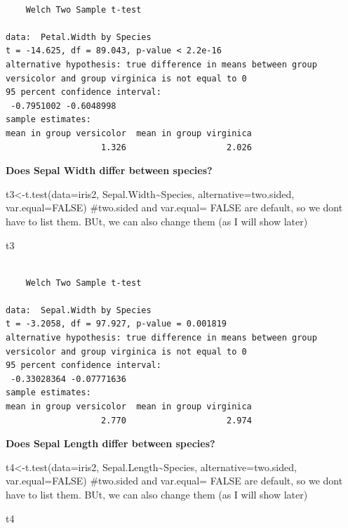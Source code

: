 \documentclass[
  letterpaper,
  DIV=11,
  numbers=noendperiod]{scrartcl}
\newenvironment{Shaded}{\begin{snugshade}}{\end{snugshade}}
\newcommand{\AttributeTok}[1]{\textcolor[rgb]{0.40,0.45,0.13}{#1}}
\newcommand{\CommentTok}[1]{\textcolor[rgb]{0.37,0.37,0.37}{#1}}
\newcommand{\ConstantTok}[1]{\textcolor[rgb]{0.56,0.35,0.01}{#1}}
\newcommand{\FunctionTok}[1]{\textcolor[rgb]{0.28,0.35,0.67}{#1}}
\newcommand{\NormalTok}[1]{\textcolor[rgb]{0.00,0.23,0.31}{#1}}
\newcommand{\OtherTok}[1]{\textcolor[rgb]{0.00,0.23,0.31}{#1}}
\newcommand{\SpecialCharTok}[1]{\textcolor[rgb]{0.37,0.37,0.37}{#1}}
\newcommand{\StringTok}[1]{\textcolor[rgb]{0.13,0.47,0.30}{#1}}
\begin{document}
\begin{verbatim}

    Welch Two Sample t-test

data:  Petal.Width by Species
t = -14.625, df = 89.043, p-value < 2.2e-16
alternative hypothesis: true difference in means between group versicolor and group virginica is not equal to 0
95 percent confidence interval:
 -0.7951002 -0.6048998
sample estimates:
mean in group versicolor  mean in group virginica 
                   1.326                    2.026 
\end{verbatim}

\hfill\break
\textbf{Does Sepal Width differ between species?}

\begin{Shaded}
\begin{Highlighting}[]
\NormalTok{t3}\OtherTok{\textless{}{-}}\FunctionTok{t.test}\NormalTok{(}\AttributeTok{data=}\NormalTok{iris2, Sepal.Width}\SpecialCharTok{\textasciitilde{}}\NormalTok{Species, }\AttributeTok{alternative=}\StringTok{\textquotesingle{}two.sided\textquotesingle{}}\NormalTok{, }\AttributeTok{var.equal=}\ConstantTok{FALSE}\NormalTok{) }\CommentTok{\#two.sided and var.equal= FALSE are default, so we don\textquotesingle{}t have to list them. BUt, we can also change them (as I will show later)}

\NormalTok{t3}
\end{Highlighting}
\end{Shaded}

\begin{verbatim}

    Welch Two Sample t-test

data:  Sepal.Width by Species
t = -3.2058, df = 97.927, p-value = 0.001819
alternative hypothesis: true difference in means between group versicolor and group virginica is not equal to 0
95 percent confidence interval:
 -0.33028364 -0.07771636
sample estimates:
mean in group versicolor  mean in group virginica 
                   2.770                    2.974 
\end{verbatim}

\hfill\break
\textbf{Does Sepal Length differ between species?}

\begin{Shaded}
\begin{Highlighting}[]
\NormalTok{t4}\OtherTok{\textless{}{-}}\FunctionTok{t.test}\NormalTok{(}\AttributeTok{data=}\NormalTok{iris2, Sepal.Length}\SpecialCharTok{\textasciitilde{}}\NormalTok{Species, }\AttributeTok{alternative=}\StringTok{\textquotesingle{}two.sided\textquotesingle{}}\NormalTok{, }\AttributeTok{var.equal=}\ConstantTok{FALSE}\NormalTok{) }\CommentTok{\#two.sided and var.equal= FALSE are default, so we don\textquotesingle{}t have to list them. BUt, we can also change them (as I will show later)}

\NormalTok{t4}
\end{Highlighting}
\end{Shaded}
\end{document}
